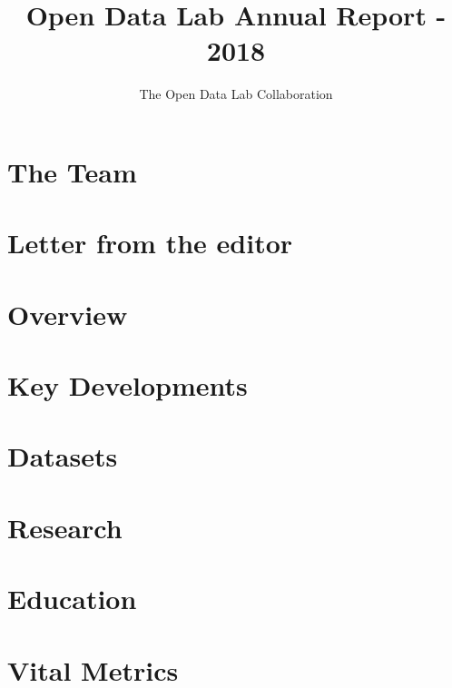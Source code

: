 \documentclass[12pt,letterpaper]{report} %
\title{Open Data Lab Annual Report - 2018}
\author{The Open Data Lab Collaboration}
\begin{document}
\maketitle

\chapter*{The Team}   %

\chapter*{Letter from the editor}   %

\tableofcontents
\pagebreak

\chapter{Overview} 

\chapter{Key Developments} 

\chapter{Datasets} 

\chapter{Research} 

\chapter{Education} 

\chapter{Vital Metrics} 

\end{document}
